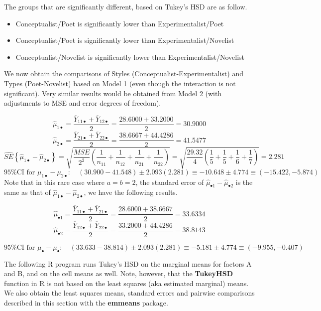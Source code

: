 \documentclass[
]{book}
\providecommand{\tightlist}{%
  \setlength{\itemsep}{0pt}\setlength{\parskip}{0pt}}
\begin{document}
The groups that are significantly different, based on Tukey's HSD are as
follow.

\begin{itemize}
\tightlist
\item
  Conceptualist/Poet is significantly lower than Experimentalist/Poet
\item
  Conceptualist/Poet is significantly lower than
  Experimentalist/Novelist
\item
  Conceptualist/Novelist is significantly lower than
  Experimentalist/Novelist
\end{itemize}

We now obtain the comparisons of Styles (Conceptualist-Experimentalist)
and Types (Poet-Novelist) based on Model 1 (even though the interaction
is not significant). Very similar results would be obtained from Model 2
(with adjustments to MSE and error degrees of freedom).

\[
\hat{\mu}_{1\bullet}=\frac{\overline{Y}_{11\bullet}+\overline{Y}_{12\bullet}}{2}=
\frac{28.6000+33.2000}{2}=30.9000  \]
\[\hat{\mu}_{2\bullet}=\frac{\overline{Y}_{21\bullet}+\overline{Y}_{22\bullet}}{2}=
\frac{38.6667+44.4286}{2}=41.5477
\] \[
\hat{SE}\left\{\hat{\mu}_{1\bullet}-\hat{\mu}_{2\bullet}\right\}=
\sqrt{\frac{MSE}{2^2}\left(
\frac{1}{n_{11}}+\frac{1}{n_{12}}+\frac{1}{n_{21}}+\frac{1}{n_{22}}\right)}=
\sqrt{\frac{29.32}{4}\left(
\frac{1}{5}+\frac{1}{5}+\frac{1}{6}+\frac{1}{7}\right)}=2.281
\] \[
95\% \mbox{CI for } \mu_{1\bullet}-\mu_{2\bullet}: \quad
(30.900-41.548) \pm 2.093(2.281)\equiv -10.648\pm 4.774\equiv (-15.422,-5.874)
\] Note that in this rare case where \(a=b=2\), the standard error of
\(\hat{\mu}_{\bullet 1}-\hat{\mu}_{\bullet 2}\) is the same as that of
\(\hat{\mu}_{1\bullet}-\hat{\mu}_{2\bullet}\), we have the following
results.

\[
\hat{\mu}_{\bullet 1}=\frac{\overline{Y}_{11\bullet}+\overline{Y}_{21\bullet}}{2}=
\frac{28.6000+38.6667}{2}=33.6334  \]
\[\hat{\mu}_{\bullet 2}=\frac{\overline{Y}_{12\bullet}+\overline{Y}_{22\bullet}}{2}=
\frac{33.2000+44.4286}{2}=38.8143
\]

\[
95\% \mbox{CI for } \mu_{\bullet}-\mu_{\bullet}: \quad (33.633-38.814)\pm
2.093(2.281)\equiv -5.181\pm 4.774\equiv (-9.955,-0.407)
\]

The following R program runs Tukey's HSD on the marginal means for
factors A and B, and on the cell means as well. Note, however, that the
\textbf{TukeyHSD} function in R is not based on the least squares (aka
estimated marginal) means. We also obtain the least squares means,
standard errors and pairwise comparisons described in this section with
the \textbf{emmeans} package.
\end{document}
